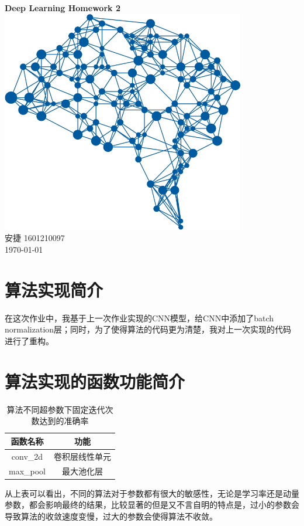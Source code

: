 \documentclass[a4paper, UTF8]{ctexrep}
\begin{document}
    \begin{titlepage}
        \centering
        \vspace{6cm}
        \LARGE{\textbf{Deep Learning Homework 2}}\\
        \vspace{4cm}
        \includegraphics[width=0.8\textwidth]{deepLearning.png}\\
        \vspace{4cm}
        \normalsize{安捷 1601210097}\\
        \normalsize{\today}
    \end{titlepage}
        \section{算法实现简介}
            在这次作业中，我基于上一次作业实现的CNN模型，给CNN中添加了batch normalization层；同时，为了使得算法的代码更为清楚，我对上一次实现的代码进行了重构。
        \section{算法实现的函数功能简介}
            \begin{table}[htbp!]
                \centering
                \begin{tabular}{cc}
                    \hline
                    函数名称 & 功能 \\
                    \hline
                    conv\_2d & 卷积层线性单元 \\
                    max\_pool & 最大池化层 \\
                    
                    \hline
                \end{tabular}
                \caption{算法不同超参数下固定迭代次数达到的准确率}
            \end{table}
            从上表可以看出，不同的算法对于参数都有很大的敏感性，无论是学习率还是动量参数，都会影响最终的结果，比较显著的但是又不言自明的特点是，过小的参数会导致算法的收敛速度变慢，过大的参数会使得算法不收敛。
            \clearpage
\end{document}

